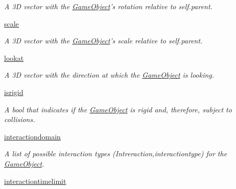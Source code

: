 \begin{DoxyCompactItemize}
\begin{DoxyCompactList}\small\item\em \-A 3\-D vector with the \hyperlink{classGameObject_1_1GameObject}{\-Game\-Object}'s rotation relative to self.\-parent. \end{DoxyCompactList}\item 
\hypertarget{classGameObject_1_1GameObject_ae022d7d0613cd1a0a2605ab7faf1f714}{\hyperlink{classGameObject_1_1GameObject_ae022d7d0613cd1a0a2605ab7faf1f714}{scale}}\label{classGameObject_1_1GameObject_ae022d7d0613cd1a0a2605ab7faf1f714}

\begin{DoxyCompactList}\small\item\em \-A 3\-D vector with the \hyperlink{classGameObject_1_1GameObject}{\-Game\-Object}'s scale relative to self.\-parent. \end{DoxyCompactList}\item 
\hypertarget{classGameObject_1_1GameObject_abeaeee33ab04cc9459cab77bb037b77b}{\hyperlink{classGameObject_1_1GameObject_abeaeee33ab04cc9459cab77bb037b77b}{lookat}}\label{classGameObject_1_1GameObject_abeaeee33ab04cc9459cab77bb037b77b}

\begin{DoxyCompactList}\small\item\em \-A 3\-D vector with the direction at which the \hyperlink{classGameObject_1_1GameObject}{\-Game\-Object} is looking. \end{DoxyCompactList}\item 
\hypertarget{classGameObject_1_1GameObject_a52d00a0bed09a38d18ca301b5204517c}{\hyperlink{classGameObject_1_1GameObject_a52d00a0bed09a38d18ca301b5204517c}{isrigid}}\label{classGameObject_1_1GameObject_a52d00a0bed09a38d18ca301b5204517c}

\begin{DoxyCompactList}\small\item\em \-A bool that indicates if the \hyperlink{classGameObject_1_1GameObject}{\-Game\-Object} is rigid and, therefore, subject to collisions. \end{DoxyCompactList}\item 
\hyperlink{classGameObject_1_1GameObject_a71b47fa67df2f55aa68c09fbfb4c2864}{interactiondomain}
\begin{DoxyCompactList}\small\item\em \-A list of possible interaction types (\-Intreraction,interactiontype) for the \hyperlink{classGameObject_1_1GameObject}{\-Game\-Object}. \end{DoxyCompactList}\item 
\hypertarget{classGameObject_1_1GameObject_a87299e77b3076fc07b69580f8a63d2fe}{\hyperlink{classGameObject_1_1GameObject_a87299e77b3076fc07b69580f8a63d2fe}{interactiontimelimit}}\label{classGameObject_1_1GameObject_a87299e77b3076fc07b69580f8a63d2fe}


\end{DoxyCompactItemize}
